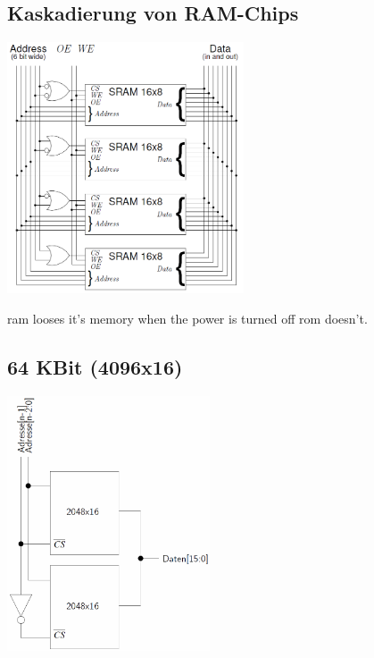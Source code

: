 	
	\begin{multicols}{2}
		\subsection{Kaskadierung von RAM-Chips}
			\begin{center}
				\includegraphics[width = 7cm]{images/mem/mem1.png}
			\end{center}
		ram looses it's memory when the power is turned off rom doesn't.
		
		
		\subsection{64 KBit (4096x16)}
			\begin{center}
			\includegraphics[width = 6cm]{images/mem/mem2-1.png}
			\end{center}
			

\end{multicols}
